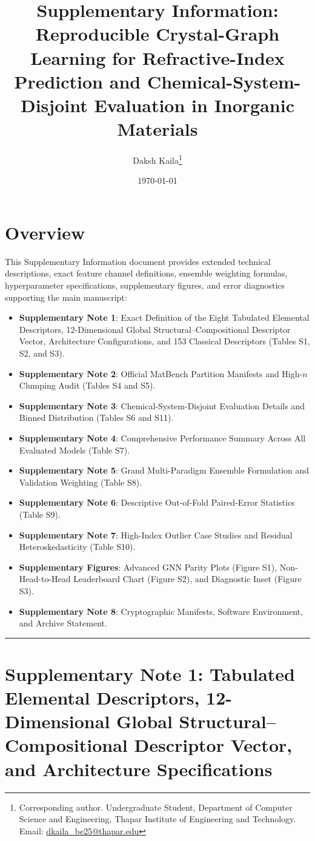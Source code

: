 \documentclass[journal,article,submit,moreauthors,pdftex]{article}
\title{\textbf{Supplementary Information:\\Reproducible Crystal-Graph Learning for Refractive-Index Prediction and Chemical-System-Disjoint Evaluation in Inorganic Materials}}
\author{Daksh Kaila\thanks{Corresponding author. Undergraduate Student, Department of Computer Science and Engineering, Thapar Institute of Engineering and Technology. Email: \href{mailto:dkaila_be25@thapar.edu}{dkaila_be25@thapar.edu}}}
\affil{Department of Computer Science and Engineering, Thapar Institute of Engineering and Technology, Patiala, Punjab 147004, India}
\date{\today}
\begin{document}
\maketitle

\section*{Overview}
This Supplementary Information document provides extended technical descriptions, exact feature channel definitions, ensemble weighting formulas, hyperparameter specifications, supplementary figures, and error diagnostics supporting the main manuscript:
\begin{itemize}
    \item \textbf{Supplementary Note 1}: Exact Definition of the Eight Tabulated Elemental Descriptors, 12-Dimensional Global Structural--Compositional Descriptor Vector, Architecture Configurations, and 153 Classical Descriptors (Tables S1, S2, and S3).
    \item \textbf{Supplementary Note 2}: Official MatBench Partition Manifests and High-$n$ Clumping Audit (Tables S4 and S5).
    \item \textbf{Supplementary Note 3}: Chemical-System-Disjoint Evaluation Details and Binned Distribution (Tables S6 and S11).
    \item \textbf{Supplementary Note 4}: Comprehensive Performance Summary Across All Evaluated Models (Table S7).
    \item \textbf{Supplementary Note 5}: Grand Multi-Paradigm Ensemble Formulation and Validation Weighting (Table S8).
    \item \textbf{Supplementary Note 6}: Descriptive Out-of-Fold Paired-Error Statistics (Table S9).
    \item \textbf{Supplementary Note 7}: High-Index Outlier Case Studies and Residual Heteroskedasticity (Table S10).
    \item \textbf{Supplementary Figures}: Advanced GNN Parity Plots (Figure S1), Non-Head-to-Head Leaderboard Chart (Figure S2), and Diagnostic Inset (Figure S3).
    \item \textbf{Supplementary Note 8}: Cryptographic Manifests, Software Environment, and Archive Statement.
\end{itemize}

\vspace{1em}
\hrule
\vspace{1.5em}

\section*{Supplementary Note 1: Tabulated Elemental Descriptors, 12-Dimensional Global Structural--Compositional Descriptor Vector, and Architecture Specifications}
\end{document}
